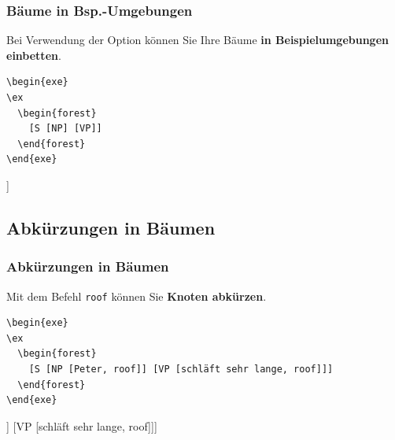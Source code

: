 \begin{frame}[fragile]
\frametitle{Bäume in Bsp.-Umgebungen}


Bei Verwendung der Option  können Sie Ihre Bäume \textbf{in Beispielumgebungen einbetten}.


\begin{lstlisting}
\begin{exe}
\ex 
  \begin{forest}
    [S [NP] [VP]]
  \end{forest}
\end{exe}
\end{lstlisting}

\begin{exe}
	\ex 
	\begin{forest}
		[S [NP] [VP]]
	\end{forest}
\end{exe}

\end{frame}


\subsection{Abkürzungen in Bäumen}

\begin{frame}[fragile]
\frametitle{Abkürzungen in Bäumen}


Mit dem Befehl \lstinline|roof| können Sie \textbf{Knoten abkürzen}.


\begin{lstlisting}
\begin{exe}
\ex 
  \begin{forest}
    [S [NP [Peter, roof]] [VP [schläft sehr lange, roof]]]
  \end{forest}
\end{exe}
\end{lstlisting}

\begin{exe}
	\ex 
	\begin{forest}
		[S [NP [Peter, roof]] [VP [schläft sehr lange, roof]]]
	\end{forest}
\end{exe}

\end{frame}


